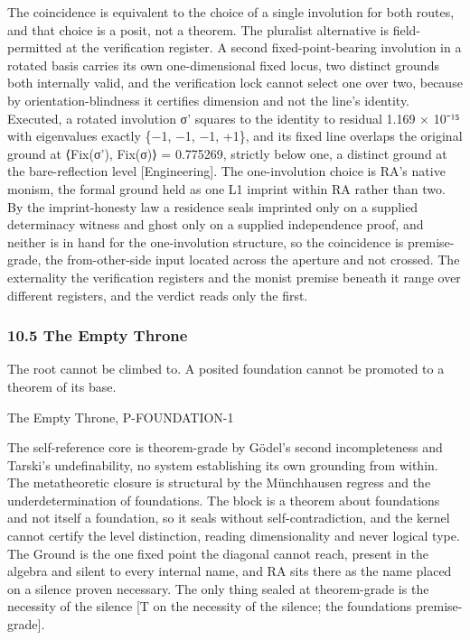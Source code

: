 \documentclass[10pt,twocolumn]{article}
\begin{document}
The coincidence is equivalent to the choice of a single involution for
both routes, and that choice is a posit, not a theorem. The pluralist
alternative is field-permitted at the verification register. A second
fixed-point-bearing involution in a rotated basis carries its own
one-dimensional fixed locus, two distinct grounds both internally valid,
and the verification lock cannot select one over two, because by
orientation-blindness it certifies dimension and not the line's
identity. Executed, a rotated involution σ' squares to the identity to
residual 1.169 × 10⁻¹⁵ with eigenvalues exactly \{−1, −1, −1, +1\}, and
its fixed line overlaps the original ground at \textbar⟨Fix(σ'),
Fix(σ)⟩\textbar{} = 0.775269, strictly below one, a distinct ground at
the bare-reflection level {[}Engineering{]}. The one-involution choice
is RA's native monism, the formal ground held as one L1 imprint within
RA rather than two. By the imprint-honesty law a residence seals
imprinted only on a supplied determinacy witness and ghost only on a
supplied independence proof, and neither is in hand for the
one-involution structure, so the coincidence is premise-grade, the
from-other-side input located across the aperture and not crossed. The
externality the verification registers and the monist premise beneath it
range over different registers, and the verdict reads only the first.

\hypertarget{the-empty-throne}{%
\subsubsection{10.5 The Empty Throne}\label{the-empty-throne}}

The root cannot be climbed to. A posited foundation cannot be promoted
to a theorem of its base.

\begin{jbox}{The Empty Throne, P-FOUNDATION-1}

The self-reference core is theorem-grade by Gödel's second
incompleteness and Tarski's undefinability, no system establishing its
own grounding from within. The metatheoretic closure is structural by
the Münchhausen regress and the underdetermination of foundations. The
block is a theorem about foundations and not itself a foundation, so it
seals without self-contradiction, and the kernel cannot certify the
level distinction, reading dimensionality and never logical type. The
Ground is the one fixed point the diagonal cannot reach, present in the
algebra and silent to every internal name, and RA sits there as the name
placed on a silence proven necessary. The only thing sealed at
theorem-grade is the necessity of the silence {[}T on the necessity of
the silence; the foundations premise-grade{]}.

\end{jbox}
\end{document}

